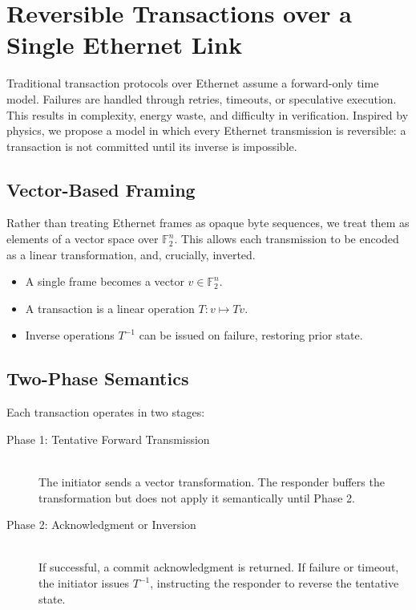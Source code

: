 \section{Reversible Transactions over a Single Ethernet Link}

Traditional transaction protocols over Ethernet assume a forward-only time model. Failures are handled through retries, timeouts, or speculative execution. This results in complexity, energy waste, and difficulty in verification. Inspired by physics, we propose a model in which every Ethernet transmission is reversible: a transaction is not committed until its inverse is impossible.

\subsection*{Vector-Based Framing}

Rather than treating Ethernet frames as opaque byte sequences, we treat them as elements of a vector space over $\mathbb{F}_2^n$. This allows each transmission to be encoded as a linear transformation, and, crucially, inverted.

\begin{itemize}
  \item A single frame becomes a vector $v \in \mathbb{F}_2^n$.
  \item A transaction is a linear operation $T: v \mapsto Tv$.
  \item Inverse operations $T^{-1}$ can be issued on failure, restoring prior state.
\end{itemize}

\subsection*{Two-Phase Semantics}

Each transaction operates in two stages:

\begin{description}
  \item[Phase 1: Tentative Forward Transmission] \hfill \\
  The initiator sends a vector transformation. The responder buffers the transformation but does not apply it semantically until Phase 2.
  
  \item[Phase 2: Acknowledgment or Inversion] \hfill \\
  If successful, a commit acknowledgment is returned. If failure or timeout, the initiator issues $T^{-1}$, instructing the responder to reverse the tentative state.
\end{description}

